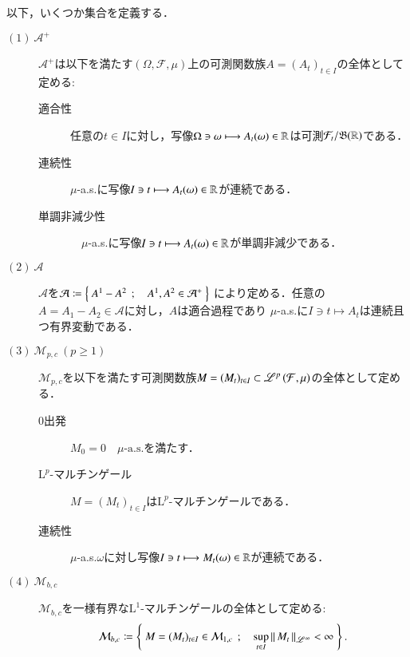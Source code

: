 	以下，いくつか集合を定義する．
	\begin{description}
		\item[$\mathrm{(1)}\ \mathcal{A}^+$] 
			$\mathcal{A}^+$は以下を満たす$(\Omega,\mathcal{F},\mu)$上の可測関数族$A = (A_t)_{t \in I}$の全体として定める:
			\begin{description}
				\item[適合性] 任意の$t \in I$に対し，写像$\Omega \ni \omega \longmapsto A_t(\omega) \in \mathbb{R}$は可測$\mathcal{F}_t/\mathfrak{B}(\mathbb{R})$である．
				\item[連続性] $\mu$-a.s.に写像$I \ni t \longmapsto A_t(\omega) \in \mathbb{R}$が連続である．
				\item[単調非減少性]　$\mu$-a.s.に写像$I \ni t \longmapsto A_t(\omega) \in \mathbb{R}$が単調非減少である．
			\end{description}
		
		\item[$\mathrm{(2)}\ \mathcal{A}$]
			$\mathcal{A}$を$\mathcal{A} \coloneqq \left\{\ A^1 - A^2\ \, ; \quad A^1,A^2 \in \mathcal{A}^+\ \right\}$
			により定める．任意の$A = A_1 - A_2 \in \mathcal{A}$に対し，$A$は適合過程であり
			$\mu$-a.s.に$I \ni t \longmapsto A_t$は連続且つ有界変動である．
			
		\item[$\mathrm{(3)}\ \mathcal{M}_{p,c}\ (p \geq 1)$]
			$\mathcal{M}_{p,c}$を以下を満たす可測関数族$M = (M_t)_{t \in I} \subset \mathscr{L}^{p} \left(\mathcal{F},\mu\right)$の全体として定める．
			\begin{description}
				\item[0出発] $M_0 = 0 \quad \mbox{$\mu$-a.s.}$を満たす．
				\item[$\mathrm{L}^p$-マルチンゲール] $M = (M_t)_{t \in I}$は$\mathrm{L}^p$-マルチンゲールである．
				\item[連続性] $\mu$-a.s.$\omega$に対し写像$I \ni t \longmapsto M_t(\omega) \in \mathbb{R}$が連続である．
			\end{description}
		
		\item[$\mathrm{(4)}\ \mathcal{M}_{b,c}$]
			$\mathcal{M}_{b,c}$を一様有界な$\mathrm{L}^1$-マルチンゲールの全体として定める:
			\begin{align}
				\mathcal{M}_{b,c} \coloneqq \left\{\ M = (M_t)_{t \in I} \in \mathcal{M}_{1,c}\ \, ; \quad \operatorname*{sup}_{t \in I} \left\|\, M_t\, \right\|_{\mathscr{L}^\infty} < \infty\ \right\}.
			\end{align}
			

\end{description}

